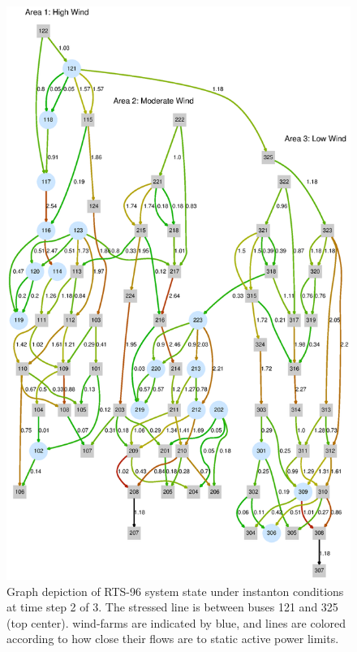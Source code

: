 \documentclass[conference]{IEEEtran}
\begin{document}

\begin{figure}[t]
\centering
\includegraphics[width=1\linewidth]{line118}
\caption{Graph depiction of RTS-96 system state under instanton conditions at time step 2 of 3. The stressed line is between buses 121 and 325 (top center). wind-farms are indicated by blue, and lines are colored according to how close their flows are to static active power limits.}
\label{fig:line118}
\end{figure}
\end{document}
